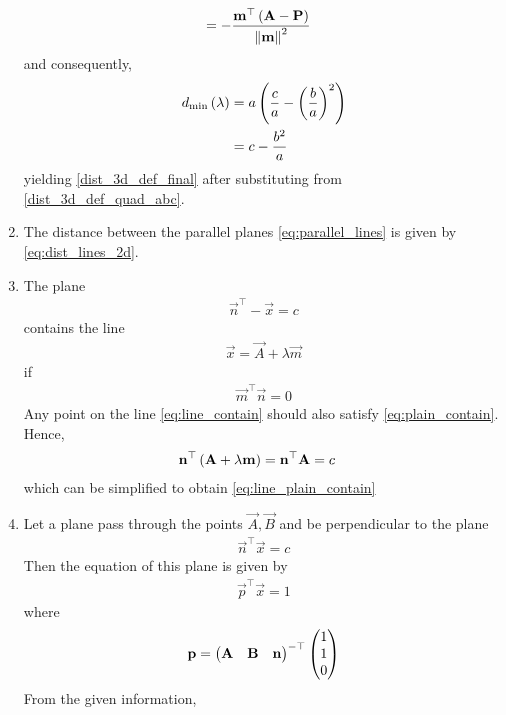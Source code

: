 \documentclass[journal,12pt,twocolumn]{IEEEtran}
\renewcommand\thesection{\arabic{section}}
\renewcommand\thesubsection{\thesection.\arabic{subsection}}
\begin{document}
\begin{enumerate}[label=\thesubsection.\arabic*.,ref=\thesubsection.\theenumi]
\begin{align}
	&= -\frac{\mathbf{m}^{\top}\left(\mathbf{A} 
			-\mathbf{P}\right)}
			{ \left\lVert\mathbf{m}\right\rVert^2}
\end{align}
and consequently, 
\begin{align}
	d_{\min}\left(\lambda \right) &=a \left(\frac{c}{a}-\left(\frac{b}{a}\right)^2 \right) 
	\\
	&=c - \frac{b^2}{a }
\end{align}
yielding
	\eqref{dist_3d_def_final} after substituting from 
	\eqref{dist_3d_def_quad_abc}.
\item The distance between the parallel planes 
	\eqref{eq:parallel_lines}
	is given by 
	\eqref{eq:dist_lines_2d}.
\item The plane 
		\begin{align}
		\vec{n}^{\top}
			-\vec{x} = c
			\label{eq:plain_contain}
		\end{align}
		contains the line 
		\begin{align}
			\vec{x} = \vec{A}+\lambda \vec{m}
			\label{eq:line_contain}
		\end{align}
		if 
		\begin{align}
		\vec{m}^{\top}\vec{n} = 0
			\label{eq:line_plain_contain}
		\end{align}
		\solution Any point on the line 
			\eqref{eq:line_contain}
			should also satisfy 
			\eqref{eq:plain_contain}.  Hence, 
		\begin{align}
			\mathbf{n}^{\top}\left(\mathbf{A}+\lambda \mathbf{m}\right) &= \mathbf{n}^{\top}\mathbf{A}=c
		\end{align}
		which can be simplified to obtain
			\eqref{eq:line_plain_contain}
		\item Let a plane pass through the points $\vec{A},\vec{B}$ and be perpendicular to the plane 
		\begin{align}
		\vec{n}^{\top}\vec{x} =c 
			\label{eq:plane_3d_2pt_perp_given}
		\end{align}
		Then the equation of this plane is given by 
		\begin{align}
		\vec{p}^{\top}\vec{x} = 1
			\label{eq:plane_3d_2pt}
		\end{align}
		where
		\begin{align}
			\mathbf{p} = 		\begin{pmatrix}\mathbf{A} & \mathbf{B} & \mathbf{n}\end{pmatrix}^{-\top}  \begin{pmatrix}1 \\ 1 \\ 0\end{pmatrix}
			\label{eq:plane_3d_2pt_perp_norm}
		\end{align}
	\solution From the given information, 

\end{enumerate}
\end{document}
